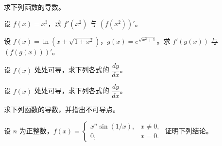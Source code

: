 \noindent\begin{minipage}{\textwidth}
求下列函数的导数。
\end{minipage}\par\vfill
\noindent\begin{minipage}{\textwidth}
设 $f(x)=x^3$，求 $f'(x^2)$ 与 $(f(x^2))'$。
\end{minipage}\par\vfill
\newpage
\noindent\begin{minipage}{\textwidth}
设 $f(x)=\ln(x+\sqrt{1+x^2})$，$g(x)=e^{\sqrt{x^2+1}}$。求 $f'(g(x))$ 与 $(f(g(x)))'$。
\end{minipage}\par\vfill
\noindent\begin{minipage}{\textwidth}
设 $f(x)$ 处处可导，求下列各式的 $\dfrac{dy}{dx}$。
\end{minipage}\par\vfill
\noindent\begin{minipage}{\textwidth}
设 $f(x)$ 处处可导，求下列各式的 $\dfrac{dy}{dx}$。
\end{minipage}\par\vfill
\noindent\begin{minipage}{\textwidth}
求下列函数的导数，并指出不可导点。
\end{minipage}\par\vfill
\newpage
\noindent\begin{minipage}{\textwidth}
设 $n$ 为正整数，$\displaystyle f(x)=\begin{cases}x^n\sin(1/x),&x\ne0,\\0,&x=0.\end{cases}$ 证明下列结论。
\end{minipage}\par\vfill
